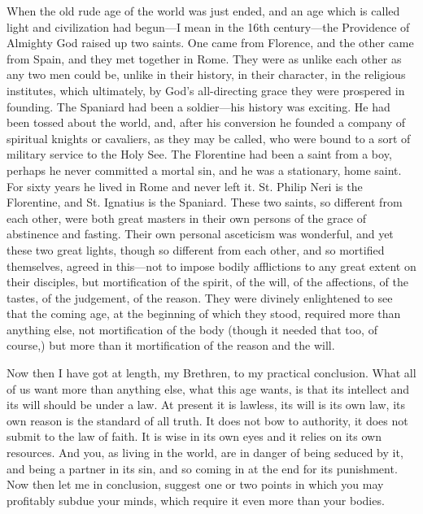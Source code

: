 When the old rude age of the world was just
ended, and an age which is called light and civilization had begun—I
mean in the 16th century—the Providence of Almighty God raised up
two saints. One came from Florence, and the other came from Spain, and
they met together in Rome. They were as unlike each other as any two
men could be, unlike in their history, in their character, in the
religious institutes, which ultimately, by God's all-directing grace
they were prospered in founding. The Spaniard had been a soldier—his
history was exciting. He had been tossed about the world, and, after
his conversion he founded a company of spiritual knights or cavaliers,
as they may be called, who were bound to a sort of military service to
the Holy See. The Florentine had been a saint from a boy, perhaps
he never committed a mortal sin, and he was a stationary, home saint.
For sixty years he lived in Rome and never left it. St. Philip Neri is
the Florentine, and St. Ignatius is the Spaniard. These two saints, so
different from each other, were both great masters in their own
persons of the grace of abstinence and fasting. Their own personal
asceticism was wonderful, and yet these two great lights, though so
different from each other, and so mortified themselves, agreed in
this—not to impose bodily afflictions to any great extent on their
disciples, but mortification of the spirit, of the will, of the
affections, of the tastes, of the judgement, of the reason. They were
divinely enlightened to see that the coming age, at the beginning of
which they stood, required more than anything else, not mortification
of the body (though it needed that too, of course,) but more than it
mortification of the reason and the will.

Now then I have got at length, my Brethren, to my
practical conclusion. What all of us want more than any­thing else,
what this age wants, is that its intellect and its will should be
under a law. At present it is lawless, its will is its own law, its
own reason is the standard of all truth. It does not bow to authority,
it does not submit to the law of faith. It is wise in its own eyes and
it relies on its own resources. And you, as living in the world, are
in danger of being seduced by it, and being a partner in its sin, and
so coming in at the end for its punishment. Now then let me in
conclusion, suggest one or two points in which you may profitably
subdue your minds, which require it even more than your bodies.

